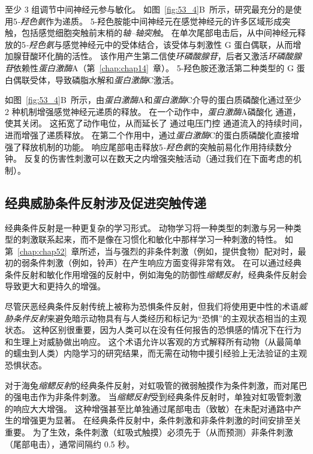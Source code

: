 至少 3 组调节中间神经元参与敏化。
如图~\ref{fig:53_4}B~所示，研究最充分的是使用5\textit{-羟色氨}作为递质。
5-羟色胺能中间神经元在感觉神经元的许多区域形成突触，包括感觉细胞突触前末梢的\textit{轴–轴突触}。
在单次尾部电击后，从中间神经元释放的5\textit{-羟色氨}与感觉神经元中的受体结合，该受体与刺激性 G 蛋白偶联，从而增加腺苷酸环化酶的活性。
该作用产生第二信使\textit{环磷酸腺苷}，后者又激活\textit{环磷酸腺苷}依赖性\textit{蛋白激酶}A（第~\ref{chap:chap14}~章）。
5-羟色胺还激活第二种类型的 G 蛋白偶联受体，导致磷脂水解和\textit{蛋白激酶}C激活。


如图~\ref{fig:53_4}B~所示，由\textit{蛋白激酶}A和\textit{蛋白激酶}C介导的蛋白质磷酸化通过至少 2 种机制增强感觉神经元递质的释放。
在一个动作中，\textit{蛋白激酶}A磷酸化  通道，使其关闭。
这拓宽了动作电位，从而延长了  通过电压门控  通道流入的持续时间，进而增强了递质释放。
在第二个作用中，通过\textit{蛋白激酶}C的蛋白质磷酸化直接增强了释放机制的功能。
响应尾部电击释放5\textit{-羟色氨}的突触前易化作用持续数分钟。
反复的伤害性刺激可以在数天之内增强突触活动（通过我们在下面考虑的机制）。



\subsection{经典威胁条件反射涉及促进突触传递}

经典条件反射是一种更复杂的学习形式。
动物学习将一种类型的刺激与另一种类型的刺激联系起来，而不是像在习惯化和敏化中那样学习一种刺激的特性。
如第~\ref{chap:chap52}~章所述，当与强烈的非条件刺激（例如，提供食物）配对时，最初的弱条件刺激（例如，铃声）在产生响应方面变得非常有效。
在可以通过经典条件反射和敏化作用增强的反射中，例如海兔的防御性\textit{缩鳃反射}，经典条件反射会导致更大和更持久的增强。


尽管厌恶经典条件反射传统上被称为恐惧条件反射，但我们将使用更中性的术语\textit{威胁条件反射}来避免暗示动物具有与人类经历和标记为“恐惧”的主观状态相当的主观状态。
这种区别很重要，因为人类可以在没有任何报告的恐惧感的情况下在行为和生理上对威胁做出响应。
这个术语允许以客观的方式解释所有动物（从最简单的蠕虫到人类）内隐学习的研究结果，而无需在动物中援引经验上无法验证的主观恐惧状态。


对于海兔\textit{缩鳃反射}的经典条件反射，对虹吸管的微弱触摸作为条件刺激，而对尾巴的强电击作为非条件刺激。
当\textit{缩鳃反射}受到经典条件反射时，单独对虹吸管刺激的响应大大增强。
这种增强甚至比单独通过尾部电击（致敏）在未配对通路中产生的增强更为显著。 
在经典条件反射中，条件刺激和非条件刺激的时间安排至关重要。
为了生效，条件刺激（虹吸式触摸）必须先于（从而预测）非条件刺激（尾部电击），通常间隔约 0.5 秒。


